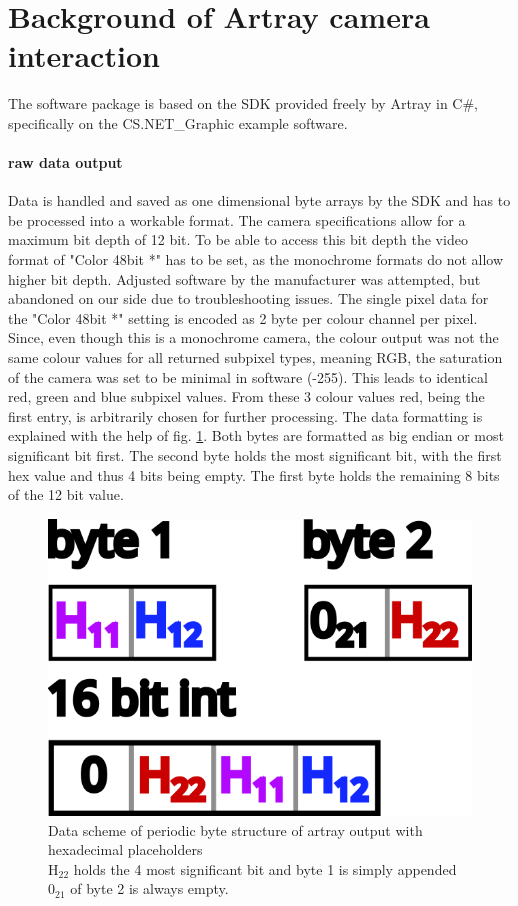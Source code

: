 \documentclass[twoside,openright]{scrreprt}
\begin{document}
{\section{Background of Artray camera interaction}
The software package is based on the SDK provided freely by Artray in C\#, specifically on the CS.NET\_Graphic example software. 

\paragraph{raw data output}
Data is handled and saved as one dimensional byte arrays by the SDK and has to be processed into a workable format.  The camera specifications allow for a maximum bit depth of 12 bit. To be able to access this bit depth the video format of "Color 48bit *" has to be set, as the monochrome formats do not allow higher bit depth. Adjusted software by the manufacturer was attempted, but abandoned on our side due to troubleshooting issues. The single pixel data for the "Color 48bit *" setting is encoded as 2 byte per colour channel per pixel. Since, even though this is a monochrome camera, the colour output was not the same colour values for all returned subpixel types, meaning RGB, the saturation of the camera was set to be minimal in software (-255). This leads to identical red, green and blue subpixel values. From these 3 colour values red, being the first entry, is arbitrarily chosen for further processing.
The data formatting is explained with the help of fig. \ref{fig:ByteArtrayOut}. Both bytes are formatted as big endian or most significant bit first. The second byte holds the most significant bit, with the first hex value and thus 4 bits being empty. The first byte holds the remaining 8 bits of the 12 bit value.

\begin{figure}[hbtp]
\centering
\includegraphics[scale=1]{images/ArtrayByteImage.png}
\caption{Data scheme of periodic byte structure of artray output with hexadecimal placeholders\\
$\mathrm{H_{22}}$ holds the 4 most significant bit and byte 1 is simply appended\\
$\mathrm{0_{21}}$ of byte 2 is always empty.\label{fig:ByteArtrayOut}}
\end{figure}

}
\end{document}
